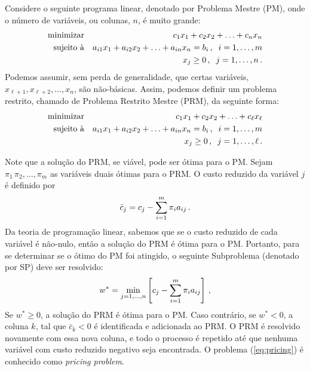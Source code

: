 Considere o seguinte programa linear, denotado por Problema Mestre (PM), onde o número de variáveis,
ou colunas, $n$, é muito grande:
%
\begin{eqnarray*} 
	\text{minimizar} && c_1 x_1 + c_2 x_2 + \ldots + c_n x_n \\
	\text{sujeito à} && a_{i1} x_1 + a_{i2} x_2 + \ldots + a_{in} x_n = b_i 
	\, , \;\; i = 1, \ldots, m \\
		               && x_j \geq 0 \, , \;\; j = 1, \ldots, n \, . 
\end{eqnarray*} 
%
Podemos assumir, sem perda de generalidade, que certas variáveis, 
$x_{\ell+1}, x_{\ell+2}, \ldots, x_{n}$, são não-básicas. Assim, podemos definir um problema
restrito, chamado de Problema Restrito Mestre (PRM), da seguinte forma:
%
\begin{eqnarray*} 
	\text{minimizar} && c_1 x_1 + c_2 x_2 + \ldots + c_\ell x_\ell \\
	\text{sujeito à} && a_{i1} x_1 + a_{i2} x_2 + \ldots + a_{in} x_n = b_i 
	\, , \;\; i = 1, \ldots, m \\
		               && x_j \geq 0 \, , \;\; j = 1, \ldots, \ell \, . 
\end{eqnarray*}

Note que a solução do PRM, se viável, pode ser ótima para o PM. Sejam $\pi_1 \, \pi_2, \ldots, 
\pi_m$ as variáveis duais ótimas para o PRM. O custo reduzido da variável $j$ é definido por
%
\begin{equation*}
\bar{c}_j = c_j - \sum_{i=1}^m \pi_i a_{ij} \, .
\end{equation*}
%
Da teoria de programação linear, sabemos que se o custo reduzido de cada variável é não-nulo, então
a solução do PRM é ótima para o PM. Portanto, para se determinar se o ótimo do PM foi atingido,
o seguinte Subproblema (denotado por SP) deve ser resolvido:
%
\begin{equation} \label{eq:pricing}
	w^\ast = \min_{j = 1, \ldots, n} \left[ c_j - \sum_{i=1}^m \pi_i a_{ij} \right] \, ,
\end{equation}
%
Se $w^\ast \geq 0$, a solução do PRM é ótima para o PM. Caso contrário, se $w^\ast < 0$, a coluna 
$k$, tal que $\bar{c}_k < 0$ é identificada e adicionada ao PRM. O PRM é resolvido novamente com 
essa nova coluna, e todo o processo é repetido até que nenhuma variável com custo reduzido negativo
seja encontrada. O problema (\ref{eq:pricing}) é conhecido como {\it pricing problem}.

